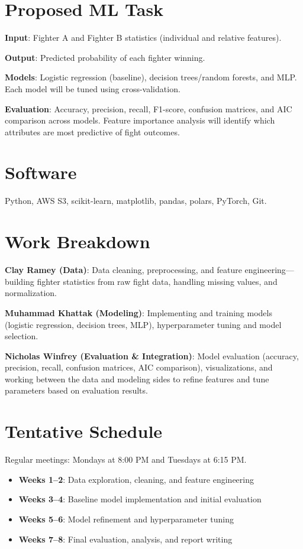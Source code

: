 \documentclass[10pt,twocolumn,letterpaper]{article}
\begin{document}
\section{Proposed ML Task}
\textbf{Input}: Fighter A and Fighter B statistics (individual and relative features).

\textbf{Output}: Predicted probability of each fighter winning.

\textbf{Models}: Logistic regression (baseline), decision trees/random forests, and MLP. Each model will be tuned using cross-validation.

\textbf{Evaluation}: Accuracy, precision, recall, F1-score, confusion matrices, and AIC comparison across models. Feature importance analysis will identify which attributes are most predictive of fight outcomes.

\section{Software}
Python, AWS S3, scikit-learn, matplotlib, pandas, polars, PyTorch, Git.

\section{Work Breakdown}

\textbf{Clay Ramey (Data)}: Data cleaning, preprocessing, and feature engineering---building fighter statistics from raw fight data, handling missing values, and normalization.

\textbf{Muhammad Khattak (Modeling)}: Implementing and training models (logistic regression, decision trees, MLP), hyperparameter tuning and model selection.

\textbf{Nicholas Winfrey (Evaluation \& Integration)}: Model evaluation (accuracy, precision, recall, confusion matrices, AIC comparison), visualizations, and working between the data and modeling sides to refine features and tune parameters based on evaluation results.

\section{Tentative Schedule}
Regular meetings: Mondays at 8:00 PM and Tuesdays at 6:15 PM.

\begin{itemize}
\item \textbf{Weeks 1--2}: Data exploration, cleaning, and feature engineering
\item \textbf{Weeks 3--4}: Baseline model implementation and initial evaluation
\item \textbf{Weeks 5--6}: Model refinement and hyperparameter tuning
\item \textbf{Weeks 7--8}: Final evaluation, analysis, and report writing
\end{itemize}
\end{document}
